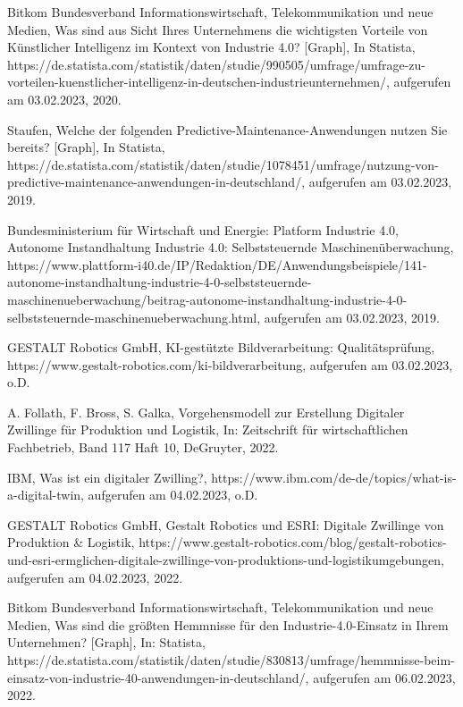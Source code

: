\begin{thebibliography}{99}
	Bitkom Bundesverband Informationswirtschaft, Telekommunikation und neue Medien,
	Was sind aus Sicht Ihres Unternehmens die wichtigsten Vorteile von Künstlicher Intelligenz im Kontext von Industrie 4.0? [Graph],
	In Statista,
	https://de.statista.com/statistik/daten/studie/990505/umfrage/umfrage-zu-vorteilen-kuenstlicher-intelligenz-in-deutschen-industrieunternehmen/,
	aufgerufen am 03.02.2023,
	2020.

	Staufen,
	Welche der folgenden Predictive-Maintenance-Anwendungen nutzen Sie bereits? [Graph],
	In Statista,
	https://de.statista.com/statistik/daten/studie/1078451/umfrage/nutzung-von-predictive-maintenance-anwendungen-in-deutschland/,
	aufgerufen am 03.02.2023,
	2019.

	Bundesministerium für Wirtschaft und Energie: Platform Industrie 4.0,
	Autonome Instandhaltung Industrie 4.0: Selbststeuernde Maschinenüberwachung,
	https://www.plattform-i40.de/IP/Redaktion/DE/Anwendungsbeispiele/141-autonome-instandhaltung-industrie-4-0-selbststeuernde-maschinenueberwachung/beitrag-autonome-instandhaltung-industrie-4-0-selbststeuernde-maschinenueberwachung.html,
	aufgerufen am 03.02.2023,
	2019.

	GESTALT Robotics GmbH,
	KI-gestützte Bildverarbeitung: Qualitätsprüfung, 
	https://www.gestalt-robotics.com/ki-bildverarbeitung, 
	aufgerufen am 03.02.2023,
	o.D.

	A. Follath, F. Bross, S. Galka,	
	Vorgehensmodell zur Erstellung Digitaler Zwillinge für Produktion und Logistik,
	In: Zeitschrift für wirtschaftlichen Fachbetrieb, Band 117 Haft 10,
	DeGruyter,
	2022.

	IBM,
	Was ist ein digitaler Zwilling?,
	https://www.ibm.com/de-de/topics/what-is-a-digital-twin,
	aufgerufen am 04.02.2023,
	o.D.

	GESTALT Robotics GmbH,
	Gestalt Robotics und ESRI: Digitale Zwillinge von Produktion \& Logistik, 
	https://www.gestalt-robotics.com/blog/gestalt-robotics-und-esri-ermglichen-digitale-zwillinge-von-produktions-und-logistikumgebungen,
	aufgerufen am 04.02.2023,
	2022.

	Bitkom Bundesverband Informationswirtschaft, Telekommunikation und neue Medien,
	Was sind die größten Hemmnisse für den Industrie-4.0-Einsatz in Ihrem Unternehmen? [Graph],
	In: Statista,
	https://de.statista.com/statistik/daten/studie/830813/umfrage/hemmnisse-beim-einsatz-von-industrie-40-anwendungen-in-deutschland/,
	aufgerufen am 06.02.2023,
	2022.


\end{thebibliography}

